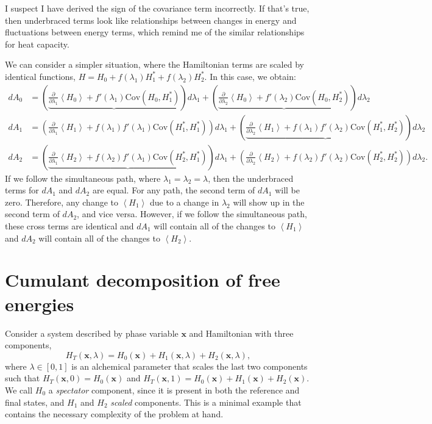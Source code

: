 \documentclass[%
 preprint,
 amsmath,amssymb,
 aps,
]{revtex4-1}
\renewcommand{\vec}[1]{{\bm{#1}}}
\begin{document}
I suspect I have derived the sign of the covariance term incorrectly. If that's true, then underbraced terms look like relationships between changes in energy and fluctuations between energy terms, which remind me of the similar relationships for heat capacity.

We can consider a simpler situation, where the Hamiltonian terms are scaled by identical functions, $H = H_0 + f(\lambda_1)H_1^* + f(\lambda_2)H_2^*$. In this case, we obtain:
\begin{align}
dA_0 &=
\left( \underbrace{
	\frac{\partial}{\partial \lambda_1}
    	\left<H_0\right> +
    	f'(\lambda_1)\mathrm{Cov}\left(H_0,H_1^*\right)
} \right) d\lambda_1 +
\left( \underbrace{
	\frac{\partial}{\partial \lambda_2}
    	\left<H_0\right> +
    	f'(\lambda_2)\mathrm{Cov}\left(H_0,H_2^*\right)
} \right) d\lambda_2 \\
dA_1 &=
\left(
	\frac{\partial}{\partial \lambda_1}
    	\left<H_1\right> +
    	f(\lambda_1)f'(\lambda_1)\mathrm{Cov}(H_1^*,H_1^*)
\right) d\lambda_1 +
\left(\underbrace{
	\frac{\partial}{\partial \lambda_2}
    	\left<H_1\right> +
    	f(\lambda_1)f'(\lambda_2)\mathrm{Cov}(H_1^*,H_2^*)
}\right) d\lambda_2 \\
dA_2 &=
\left(\underbrace{
	\frac{\partial}{\partial \lambda_1}
    	\left<H_2\right> +
    	f(\lambda_2)f'(\lambda_1)\mathrm{Cov}(H_2^*,H_1^*)
}\right) d\lambda_1 +
\left(
	\frac{\partial}{\partial \lambda_2}
    	\left<H_2\right> +
    	f(\lambda_2)f'(\lambda_2)\mathrm{Cov}(H_2^*, H_2^*)
\right) d\lambda_2.
\end{align}
If we follow the simultaneous path, where $\lambda_1 = \lambda_2 = \lambda$, then the underbraced terms for $dA_1$ and $dA_2$ are equal. For any path, the second term of $dA_1$ will be zero. Therefore, any change to $\left< H_1 \right>$ due to a change in $\lambda_2$ will show up in the second term of $dA_2$, and vice versa. However, if we follow the simultaneous path, these cross terms are identical and $dA_1$ will contain all of the changes to $\left< H_1 \right>$ and $dA_2$ will contain all of the changes to $\left< H_2 \right>$.


\section{Cumulant decomposition of free energies}
\label{S:CumulantGeneral}

Consider a system described by phase variable $\vec{x}$ and Hamiltonian with three components,
\begin{equation}
H_T(\vec{x},\lambda) = H_0(\vec{x}) + H_1(\vec{x},\lambda) + H_2(\vec{x},\lambda),
\end{equation}
where $\lambda \in [ 0, 1] $ is an alchemical parameter that scales the last two components such that 
$
H_T(\vec{x},0) = H_0 (\vec{x})
$
and 
$
H_T(\vec{x},1) = H_0(\vec{x}) + H_1(\vec{x}) + H_2(\vec{x}).
$
We call $H_0$ a \emph{spectator} component, since it is present in both the reference and final states, and $H_1$ and $H_2$ \emph{scaled} components.  This is a minimal example that contains the necessary complexity of the problem at hand.
 
\end{document}
